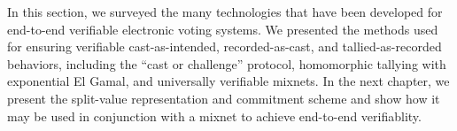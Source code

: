 In this section, we surveyed the many technologies that have been developed for end-to-end verifiable electronic voting systems. We presented the methods used for ensuring verifiable cast-as-intended, recorded-as-cast, and tallied-as-recorded behaviors, including the ``cast or challenge'' protocol, homomorphic tallying with exponential El Gamal, and universally verifiable mixnets. In the next chapter, we present the split-value representation and commitment scheme and show how it may be used in conjunction with a mixnet to achieve end-to-end verifiablity.






